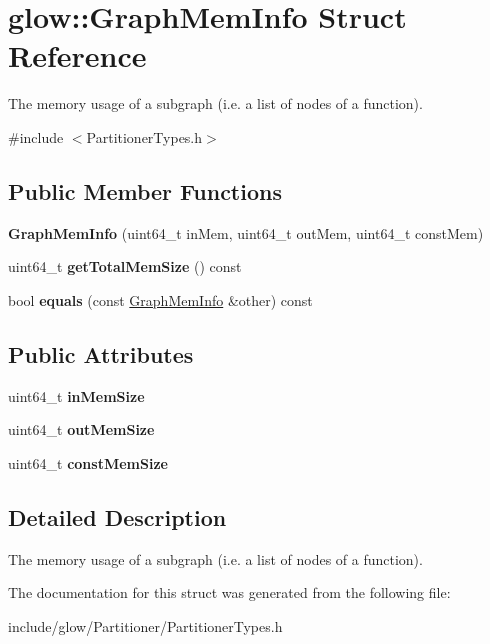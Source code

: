 \hypertarget{structglow_1_1_graph_mem_info}{}\section{glow\+:\+:Graph\+Mem\+Info Struct Reference}
\label{structglow_1_1_graph_mem_info}


The memory usage of a subgraph (i.\+e. a list of nodes of a function).  




{\ttfamily \#include $<$Partitioner\+Types.\+h$>$}

\subsection*{Public Member Functions}
\begin{DoxyCompactItemize}
\item 
\mbox{\label{structglow_1_1_graph_mem_info_afec0770b33ac3246d17f878409e927bd}} 
{\bfseries Graph\+Mem\+Info} (uint64\+\_\+t in\+Mem, uint64\+\_\+t out\+Mem, uint64\+\_\+t const\+Mem)
\item 
\mbox{\label{structglow_1_1_graph_mem_info_a759a52f0316126db23dc17eda59f74b9}} 
uint64\+\_\+t {\bfseries get\+Total\+Mem\+Size} () const
\item 
\mbox{\label{structglow_1_1_graph_mem_info_a4796646351b1f4536b404d716a3d8742}} 
bool {\bfseries equals} (const \hyperlink{structglow_1_1_graph_mem_info}{Graph\+Mem\+Info} \&other) const
\end{DoxyCompactItemize}
\subsection*{Public Attributes}
\begin{DoxyCompactItemize}
\item 
\mbox{\label{structglow_1_1_graph_mem_info_a9d9e2fc8b0be788223dfc62d8c5af926}} 
uint64\+\_\+t {\bfseries in\+Mem\+Size}
\item 
\mbox{\label{structglow_1_1_graph_mem_info_ae033f68c73dda0ca573b8a850c7f44b2}} 
uint64\+\_\+t {\bfseries out\+Mem\+Size}
\item 
\mbox{\label{structglow_1_1_graph_mem_info_a74800fbc351c03aee292c9ff949cca14}} 
uint64\+\_\+t {\bfseries const\+Mem\+Size}
\end{DoxyCompactItemize}


\subsection{Detailed Description}
The memory usage of a subgraph (i.\+e. a list of nodes of a function). 

The documentation for this struct was generated from the following file\+:\begin{DoxyCompactItemize}
\item 
include/glow/\+Partitioner/Partitioner\+Types.\+h\end{DoxyCompactItemize}
